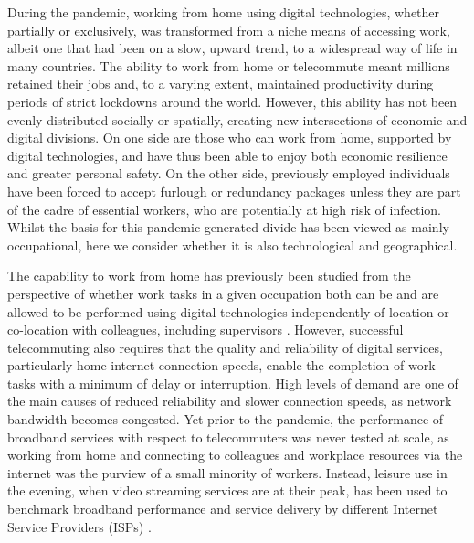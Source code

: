 \documentclass[]{interact}
\theoremstyle{plain}%
\theoremstyle{definition}
\theoremstyle{remark}
\begin{document}
During the pandemic, working from home using digital technologies,
whether partially or exclusively, was transformed from a niche means of
accessing work, albeit one that had been on a slow, upward trend, to a
widespread way of life in many countries. The ability to work from home
or telecommute meant millions retained their jobs and, to a varying
extent, maintained productivity during periods of strict lockdowns
around the world. However, this ability has not been evenly distributed
socially or spatially, creating new intersections of economic and
digital divisions. On one side are those who can work from home,
supported by digital technologies, and have thus been able to enjoy both
economic resilience and greater personal safety. On the other side,
previously employed individuals have been forced to accept furlough or
redundancy packages unless they are part of the cadre of essential
workers, who are potentially at high risk of infection. Whilst the basis
for this pandemic-generated divide has been viewed as mainly
occupational, here we consider whether it is also technological and
geographical.

The capability to work from home has previously been studied from the
perspective of whether work tasks in a given occupation both can be and
are allowed to be performed using digital technologies independently of
location or co-location with colleagues, including supervisors
\citep{allen2015effective, singh2013modeling}. However, successful
telecommuting also requires that the quality and reliability of digital
services, particularly home internet connection speeds, enable the
completion of work tasks with a minimum of delay or interruption. High
levels of demand are one of the main causes of reduced reliability and
slower connection speeds, as network bandwidth becomes congested. Yet
prior to the pandemic, the performance of broadband services with
respect to telecommuters was never tested at scale, as working from home
and connecting to colleagues and workplace resources via the internet
was the purview of a small minority of workers. Instead, leisure use in
the evening, when video streaming services are at their peak, has been
used to benchmark broadband performance and service delivery by
different Internet Service Providers (ISPs) \citep{ofcom2017}.
\end{document}
